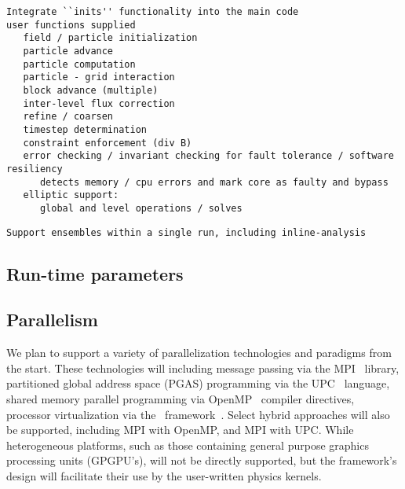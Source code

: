\documentclass{article}
\begin{document}
\begin{verbatim}
Integrate ``inits'' functionality into the main code
user functions supplied
   field / particle initialization
   particle advance
   particle computation
   particle - grid interaction
   block advance (multiple)
   inter-level flux correction
   refine / coarsen
   timestep determination
   constraint enforcement (div B)
   error checking / invariant checking for fault tolerance / software resiliency
      detects memory / cpu errors and mark core as faulty and bypass
   elliptic support:
      global and level operations / solves
\end{verbatim}


\begin{verbatim}
Support ensembles within a single run, including inline-analysis
\end{verbatim}

\subsection{Run-time parameters} \label{ss:design-parameters}



\subsection{Parallelism} \label{ss:design-parallel}

We plan to support a variety of parallelization technologies and
paradigms from the start.  These technologies will including message
passing via the MPI~\cite{@@@MPI} library, partitioned global address
space (PGAS) programming via the UPC~\cite{@@@UPC} language, shared
memory parallel programming via OpenMP~\cite{@@@OpenMP} compiler
directives, processor virtualization via the \charm\
framework~\cite{@@@Charm}.  Select hybrid approaches will also be
supported, including MPI with OpenMP, and MPI with UPC.  While
heterogeneous platforms, such as those containing general purpose
graphics processing units (GPGPU's), will not be directly supported,
but the framework's design will facilitate their use by the
user-written physics kernels.
\end{document}

